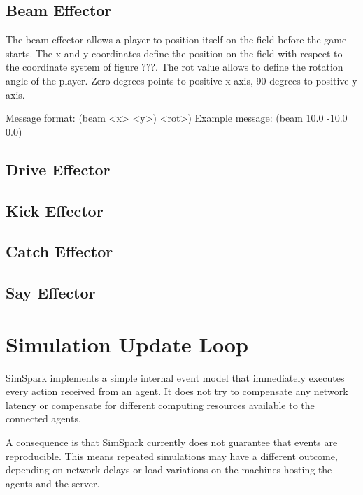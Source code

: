 \subsection{Beam Effector}
The beam effector allows a player to position itself on the field before the
game starts. The x and y coordinates define the position on the field with
respect to the coordinate system of figure ???. The rot value allows to define
the rotation angle of the player. Zero degrees points to positive x axis, 90
degrees to positive y axis.

Message format: (beam <x> <y>)
<rot>) Example message: (beam 10.0 -10.0 0.0)

\subsection{Drive Effector}


\subsection{Kick Effector}


\subsection{Catch Effector}


\subsection{Say Effector}

\section{Simulation Update Loop}


SimSpark implements a simple internal event model that immediately
executes every action received from an agent. It does not try to
compensate any network latency or compensate for different computing
resources available to the connected agents.

A consequence is that SimSpark currently does not guarantee that
events are reproducible. This means repeated simulations may have a
different outcome, depending on network delays or load variations on
the machines hosting the agents and the server.

